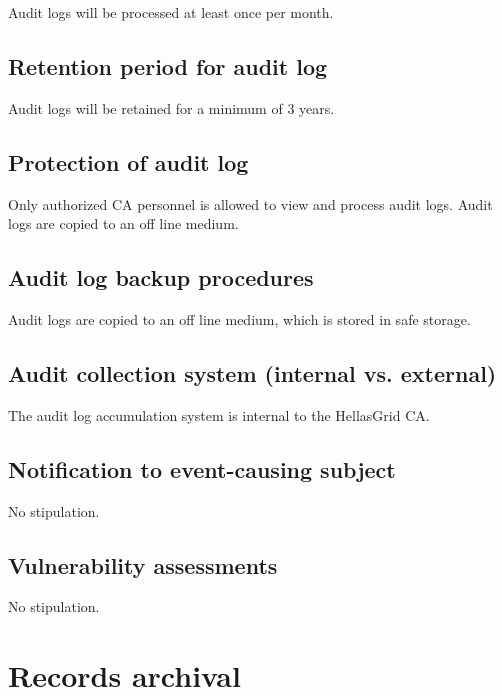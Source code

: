 Audit logs will be processed at least once per month.


\subsection{Retention period for audit log}

Audit logs will be retained for a minimum of 3 years.

\subsection{Protection of audit log}

Only authorized CA personnel is allowed to view and process audit logs. Audit logs are copied to an off line medium.

\subsection{Audit log backup procedures}

Audit logs are copied to an off line medium, which is stored in safe storage.

\subsection{Audit collection system (internal vs. external)}

The audit log accumulation system is internal to the HellasGrid CA.

\subsection{Notification to event-causing subject}

No stipulation.

\subsection{Vulnerability assessments}

No stipulation.



\section{Records archival}
